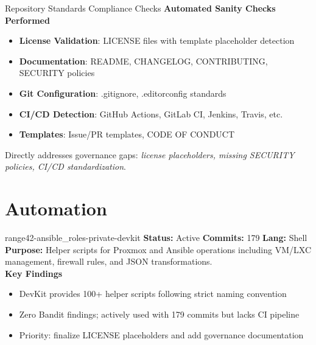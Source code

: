 \documentclass[aspectratio=169]{beamer}
\begin{document}
\begin{frame}{Repository Standards Compliance Checks}
  \faClipboardCheck\;
  \textbf{Automated Sanity Checks Performed}
  \begin{itemize}
    \item \textbf{License Validation}: LICENSE files with template placeholder detection
    \item \textbf{Documentation}: README, CHANGELOG, CONTRIBUTING, SECURITY policies
    \item \textbf{Git Configuration}: .gitignore, .editorconfig standards
    \item \textbf{CI/CD Detection}: GitHub Actions, GitLab CI, Jenkins, Travis, etc.
    \item \textbf{Templates}: Issue/PR templates, CODE OF CONDUCT
  \end{itemize}
  \begin{tcolorbox}
    \faInfoCircle\; Directly addresses governance gaps: \emph{license placeholders, missing SECURITY policies, CI/CD standardization}.
  \end{tcolorbox}
\end{frame}

\section{Automation}

\begin{frame}{range42-ansible\_roles-private-devkit \; \faTerminal}
  \textbf{Status:} Active \hfill \textbf{Commits:} 179 \hfill \textbf{Lang:} Shell\\[2mm]
  \textbf{Purpose:} Helper scripts for Proxmox and Ansible operations including VM/LXC management, firewall rules, and JSON transformations.\\[2mm]
  \textbf{Key Findings}
  \begin{itemize}
    \item DevKit provides 100+ helper scripts following strict naming convention
    \item Zero Bandit findings; actively used with 179 commits but lacks CI pipeline
    \item Priority: finalize LICENSE placeholders and add governance documentation
  \end{itemize}
\end{frame}
\end{document}

